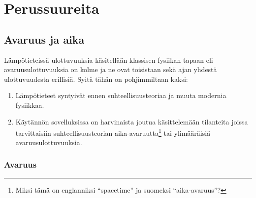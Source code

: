\documentclass[12pt,a4paper,finnish]{book}
\begin{document}
% 


\chapter{Perussuureita} %

\section{Avaruus ja aika} %

Lämpötieteissä ulottuvuuksia käsitellään klassisen fysiikan tapaan eli avaruusulottuvuuksia on kolme ja ne ovat 
toisistaan sekä ajan yhdestä ulottuvuudesta erillisiä. Syitä tähän on pohjimmiltaan kaksi:

\begin{enumerate}
 \item Lämpötieteet syntyivät ennen suhteellisuusteoriaa ja muuta modernia fysiikkaa.
 \item Käytännön sovelluksissa on harvinaista joutua käsittelemään tilanteita joissa tarvittaisiin 
 suhteellisuusteorian aika-avaruutta\footnote{Miksi tämä on englanniksi ``spacetime'' ja suomeksi ``aika-avaruus''?}
 tai ylimääräisiä avaruusulottuvuuksia.
\end{enumerate}

\subsection{Avaruus}
\end{document}

